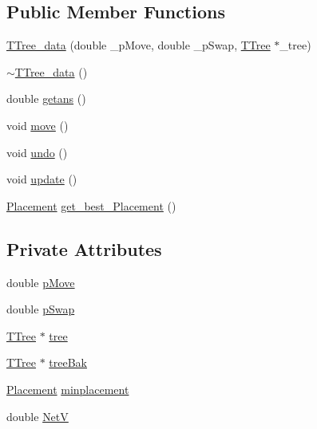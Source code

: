 \subsection*{Public Member Functions}
\begin{DoxyCompactItemize}
\item 
\hyperlink{classTTree__data_a5c15fc4f6ad8453e6de07e3defd1faeb}{T\+Tree\+\_\+data} (double \+\_\+p\+Move, double \+\_\+p\+Swap, \hyperlink{classTTree}{T\+Tree} $\ast$\+\_\+tree)
\item 
\hyperlink{classTTree__data_aa3716b863f1ea154dcef9bb0cb2fab5a}{$\sim$\+T\+Tree\+\_\+data} ()
\item 
double \hyperlink{classTTree__data_a2524c0f18f01378fc80fd558e3b7cebb}{getans} ()
\item 
void \hyperlink{classTTree__data_a16a5d735999764d45d38d2327955696e}{move} ()
\item 
void \hyperlink{classTTree__data_ac2f447392cb0cf81db44d4f85d4bfd8a}{undo} ()
\item 
void \hyperlink{classTTree__data_a828b99a40bab8933fd3c648ee4f10d85}{update} ()
\item 
\hyperlink{classPlacement}{Placement} \hyperlink{classTTree__data_a4043bb9cd9f3d3b2509653d567c11fa8}{get\+\_\+best\+\_\+\+Placement} ()
\end{DoxyCompactItemize}
\subsection*{Private Attributes}
\begin{DoxyCompactItemize}
\item 
double \hyperlink{classTTree__data_a45c965402cccc4fd9a4cfcffd3fb991f}{p\+Move}
\item 
double \hyperlink{classTTree__data_a14ad1213b452c13d7385fbf6f74e1fcf}{p\+Swap}
\item 
\hyperlink{classTTree}{T\+Tree} $\ast$ \hyperlink{classTTree__data_adb6a018eb7424a0205ff478287dffab5}{tree}
\item 
\hyperlink{classTTree}{T\+Tree} $\ast$ \hyperlink{classTTree__data_a26a88706b642cb77cb2f7e152ffe16c3}{tree\+Bak}
\item 
\hyperlink{classPlacement}{Placement} \hyperlink{classTTree__data_af901c9da93c6d1558565c919019e2aa8}{minplacement}
\item 
double \hyperlink{classTTree__data_ab63ddf6e7ecf680762cc3af591986d73}{Net\+V}
\end{DoxyCompactItemize}


